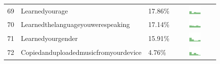 \documentclass[a4paper,12pt]{article}
\begin{document}
\begin{longtable}{| p{0.5cm} | p{7cm} | p{1cm} | c |}
69 & Learnedyourage & 17.86\% & \includegraphics[width = 2cm, height = 0.5cm]{learnedyourageFRIENDS} \\  
70 & Learnedthelanguageyouwerespeaking & 17.14\% & \includegraphics[width = 2cm, height = 0.5cm]{learnedthelanguageyouwerespeakingFRIENDS} \\  
71 & Learnedyourgender & 15.91\% & \includegraphics[width = 2cm, height = 0.5cm]{learnedyourgenderFRIENDS} \\  
72 & Copiedanduploadedmusicfromyourdevice & 4.76\% & \includegraphics[width = 2cm, height = 0.5cm]{copiedanduploadedmusicfromyourdeviceFRIENDS} \\  
\end{longtable}
\end{document}
